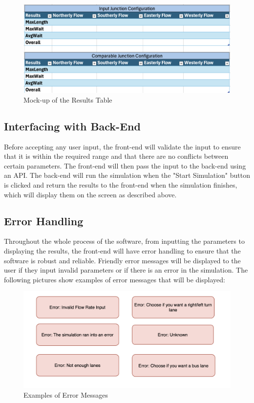 \documentclass{article}
\begin{document}
\begin{figure}[H]
    \centering
    \includegraphics[width=\textwidth]{frontendoutput.png}
    \caption{Mock-up of the Results Table}
    \label{frontendoutput}
\end{figure}

\subsection{Interfacing with Back-End}
Before accepting any user input, the front-end will validate the input to ensure that it is within the required range and that there are no conflicts between certain parameters.
The front-end will then pass the input to the back-end using an API. The back-end will run the simulation when the "Start Simulation" button is clicked and return the results to the front-end when the simulation finishes,
which will display them on the screen as described above.

\subsection{Error Handling}
Throughout the whole process of the software, from inputting the parameters to displaying the results, the front-end will have error handling to ensure that the software is robust and reliable.
Friendly error messages will be displayed to the user if they input invalid parameters or if there is an error in the simulation. The following pictures show examples of error messages that will be displayed:

\begin{figure}[H]
    \centering
    \includegraphics[width=\textwidth]{errormsg.png}
    \caption{Examples of Error Messages}
    \label{errormsg}
\end{figure}
\end{document}
